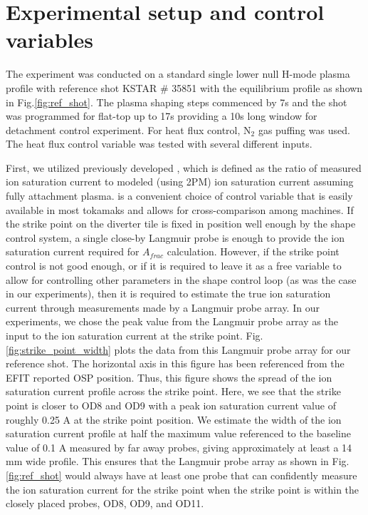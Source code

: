

\section{Experimental setup and control variables}
\label{sec:control_variables}



The experiment was conducted on a standard single lower null H-mode plasma profile with reference shot KSTAR \# 35851 with the equilibrium profile as shown in Fig.\ref{fig:ref_shot}.
The plasma shaping steps commenced by 7s and the shot was programmed for flat-top up to 17s providing a 10s long window for detachment control experiment.
For heat flux control, N$_2$ gas puffing was used.
The heat flux control variable was tested with several different inputs.

First, we utilized previously developed \Afrac\cite{Eldon_2022_PPCF}, which is defined as the ratio of measured ion saturation current to modeled (using 2PM\cite{Leonard_2018_PPCF}) ion saturation current assuming fully attachment plasma.
\Afrac is a convenient choice of control variable that is easily available in most tokamaks and allows for cross-comparison among machines.
If the strike point on the diverter tile is fixed in position well enough by the shape control system, a single close-by Langmuir probe is enough to provide the ion saturation current required for $A_{frac}$ calculation.
However, if the strike point control is not good enough, or if it is required to leave it as a free variable to allow for controlling other parameters in the shape control loop (as was the case in our experiments), then it is required to estimate the true ion saturation current through measurements made by a Langmuir probe array.
In our experiments, we chose the peak value from the Langmuir probe array as the input to the ion saturation current at the strike point.
Fig.\ref{fig:strike_point_width} plots the data from this Langmuir probe array for our reference shot.
The horizontal axis in this figure has been referenced from the EFIT reported \ac{OSP} position.
Thus, this figure shows the spread of the ion saturation current profile across the strike point.
Here, we see that the strike point is closer to OD8 and OD9 with a peak ion saturation current value of roughly 0.25 A at the strike point position.
We estimate the width of the ion saturation current profile at half the maximum value referenced to the baseline value of 0.1 A measured by far away probes, giving approximately at least a 14 mm wide profile.
This ensures that the Langmuir probe array as shown in Fig.\ref{fig:ref_shot} would always have at least one probe that can confidently measure the ion saturation current for the strike point when the strike point is within the closely placed probes, OD8, OD9, and OD11.

